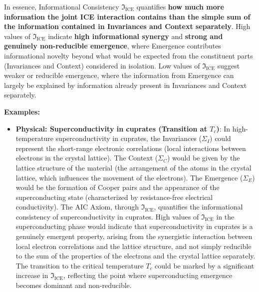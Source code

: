\documentclass{article}
\begin{document}
In essence, Informational Consistency $\mathfrak{I}_\text{ICE}$ quantifies \textbf{how much more information the joint ICE interaction contains than the simple sum of the information contained in Invariances and Context separately}. High values of $\mathfrak{I}_\text{ICE}$ indicate \textbf{high informational synergy} and \textbf{strong and genuinely non-reducible emergence}, where Emergence contributes informational novelty beyond what would be expected from the constituent parts (Invariances and Context) considered in isolation. Low values of $\mathfrak{I}_\text{ICE}$ suggest weaker or reducible emergence, where the information from Emergence can largely be explained by information already present in Invariances and Context separately.\par

\textbf{Examples:}
\begin{itemize}
\item \textbf{Physical: Superconductivity in cuprates (Transition at $T_c$)}: In high-temperature superconductivity in cuprates, the Invariances ($\Sigma_I$) could represent the short-range electronic correlations (local interactions between electrons in the crystal lattice). The Context ($\Sigma_C$) would be given by the lattice structure of the material (the arrangement of the atoms in the crystal lattice, which influences the movement of the electrons). The Emergence ($\Sigma_E$) would be the formation of Cooper pairs and the appearance of the superconducting state (characterized by resistance-free electrical conductivity). The AIC Axiom, through $\mathfrak{I}_\text{ICE}$, quantifies the informational consistency of superconductivity in cuprates. High values of $\mathfrak{I}_\text{ICE}$ in the superconducting phase would indicate that superconductivity in cuprates is a genuinely emergent property, arising from the synergistic interaction between local electron correlations and the lattice structure, and not simply reducible to the sum of the properties of the electrons and the crystal lattice separately. The transition to the critical temperature $T_c$ could be marked by a significant increase in $\mathfrak{I}_\text{ICE}$, reflecting the point where superconducting emergence becomes dominant and non-reducible.

\end{itemize}
\end{document}
